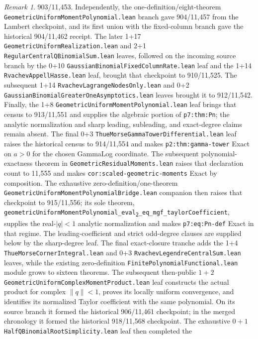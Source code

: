 \documentclass[11pt,oneside]{article}
\theoremstyle{definition}
\theoremstyle{remark}
\newtheorem{remark}[theorem]{Remark}
\newcommand{\leansubtwo}[2]{%
  \nolinkurl{#1}\texttt{\textsubscript{2}}\nolinkurl{#2}}
\begin{document}
\begin{remark}
903/11,453.  Independently, the one-definition/eight-theorem
\nolinkurl{GeometricUniformMomentPolynomial.lean} branch gave 904/11,457
from the Lambert checkpoint, and its first union with the fixed-column branch
gave the historical 904/11,462 receipt.  The later 1+17
\nolinkurl{GeometricUniformRealization.lean} and 2+1
\nolinkurl{RegularCentralQBinomialSum.lean} leaves, followed on the incoming
source branch by the 0+10
\nolinkurl{GaussianBinomialFixedColumnRate.lean} leaf and the 1+14
\nolinkurl{RvachevAppellHasse.lean} leaf, brought that checkpoint to
910/11,525.  The subsequent 1+14
\nolinkurl{RvachevLagrangeNodesOnly.lean} and 0+2
\nolinkurl{GaussianBinomialGreaterOneAsymptotics.lean} leaves brought it to
912/11,542.  Finally, the 1+8
\nolinkurl{GeometricUniformMomentPolynomial.lean} leaf brings that census
to 913/11,551 and supplies the algebraic portion of \nolinkurl{p7:thm:Pn}; the
analytic normalization and sharp leading, subleading, and exact-degree claims
remain absent.  The final 0+3
\nolinkurl{ThueMorseGammaTowerDifferential.lean} leaf raises the historical census
to 914/11,554 and makes \nolinkurl{p2:thm:gamma-tower} Exact on \(a>0\) for
the chosen GammaLog coordinate.  The subsequent polynomial-exactness theorem
in \nolinkurl{GeometricResidualMoments.lean} raises that declaration count
to 11,555 and makes \nolinkurl{cor:scaled-geometric-moments} Exact by
composition.  The exhaustive zero-definition/one-theorem
\nolinkurl{GeometricUniformMomentPolynomialBridge.lean} companion then raises
that checkpoint to 915/11,556; its sole theorem,
\leansubtwo{geometricUniformMomentPolynomial_eval}{_eq_mgf_taylorCoefficient},
supplies the real-\(\lvert q\rvert<1\) analytic normalization and makes
\nolinkurl{p7:eq:Pn-def} Exact in that regime.  The leading-coefficient and
strict odd-degree clauses are supplied below by the sharp-degree leaf.  The
final exact-closure tranche adds
the 1+4 \nolinkurl{ThueMorseCornerIntegral.lean} and 0+3
\nolinkurl{RvachevLegendreCentralSum.lean} leaves, while the existing
zero-definition \nolinkurl{FinitePolynomialFunctional.lean} module grows to
sixteen theorems.  The subsequent then-public \(1+2\)
\nolinkurl{GeometricUniformComplexMomentProduct.lean} leaf constructs the
actual product for complex \(\lVert q\rVert<1\), proves its locally uniform
convergence, and identifies its normalized Taylor coefficient with the same
polynomial.  On its source branch it formed the historical 906/11,461
checkpoint; in the merged chronology it formed the historical 918/11,568
checkpoint.  The exhaustive \(0+1\)
\nolinkurl{HalfQBinomialRootSimplicity.lean} leaf then completed the

\end{remark}
\end{document}
